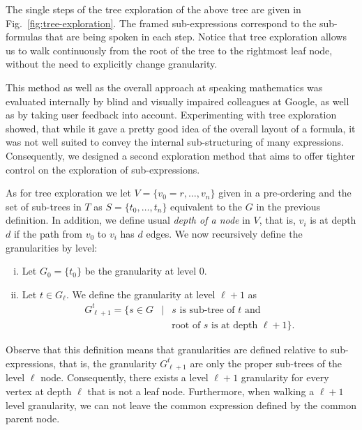 \documentclass{sig-alternate}
\begin{document}
The single steps of the tree exploration of the above tree are given in
Fig.~\ref{fig:tree-exploration}.  The framed sub-expressions correspond to the
sub-formulas that are being spoken in each step.  Notice that tree exploration
allows us to walk continuously from the root of the tree to the rightmost leaf
node, without the need to explicitly change granularity.

This method as well as the overall approach at speaking mathematics was
evaluated internally by blind and visually impaired colleagues at Google, as
well as by taking user feedback into account.  Experimenting with tree
exploration showed, that while it gave a pretty good idea of the overall layout
of a formula, it was not well suited to convey the internal sub-structuring of
many expressions. Consequently, we designed a second exploration method that
aims to offer tighter control on the exploration of sub-expressions.

As for tree exploration we let $V=\{v_0=r,\ldots,v_n\}$ given in a pre-ordering
and the set of sub-trees in $T$ as $S=\{t_0,\ldots, t_n\}$ equivalent to the $G$
in the previous definition. In addition, we define usual \emph{depth of a node}
in $V$, that is, $v_i$ is at depth $d$ if the path from $v_0$ to $v_i$ has $d$
edges. We now recursively define the granularities by level:
\begin{enumerate}[(i)]
\item Let $G_0=\{t_0\}$ be the granularity at level $0$.
\item Let $t\in G_\ell$. We define the granularity at level $\ell + 1$ as
  \begin{eqnarray*}
    G^t_{\ell+1} = \{s\in G & | & s \mbox{ is sub-tree of } t\mbox{ and }\\ 
    & & \mbox{root of } s \mbox{ is at depth } \ell+1\}.
  \end{eqnarray*}
\end{enumerate}
Observe that this definition means that granularities are defined relative to
sub-expressions, that is, the granularity $G^t_{\ell+1}$ are only the proper
sub-trees of the level $\ell$ node. Consequently, there exists a level $\ell+1$
granularity for every vertex at depth $\ell$ that is not a leaf
node. Furthermore, when walking a $\ell+1$ level granularity, we can not leave
the common expression defined by the common parent node.
\end{document}
